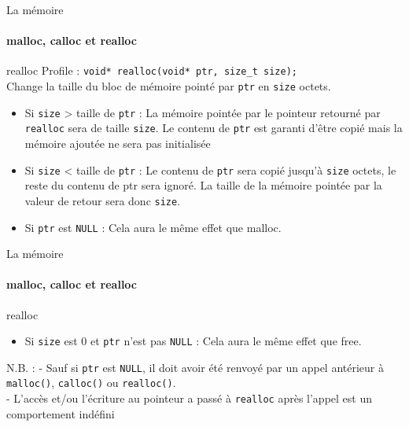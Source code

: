 	\begin{frame}{La mémoire}
		\framesubtitle{malloc, calloc et realloc}
		\begin{block}{realloc}
			\alert{Profile} : \texttt{void* realloc(void* ptr, size\_t size);} \\
			Change la taille du bloc de mémoire pointé par \texttt{ptr} en \texttt{size} octets. 
			\begin{itemize}
				\item Si \texttt{size} > taille de \texttt{ptr} : La mémoire pointée par le pointeur retourné par \texttt{realloc} sera de taille \texttt{size}. Le contenu de \texttt{ptr} est garanti d'être copié mais la mémoire ajoutée ne sera \alert{pas initialisée}
				\item Si \texttt{size} < taille de \texttt{ptr} : Le contenu de \texttt{ptr} sera copié jusqu'à \texttt{size} octets, le reste du contenu de ptr sera ignoré. La taille de la mémoire pointée par la valeur de retour sera donc \texttt{size}.
				\item Si \texttt{ptr} est \texttt{NULL} : Cela aura le même effet que malloc.
			\end{itemize}
		\end{block}
	\end{frame}

	\begin{frame}{La mémoire}
		\framesubtitle{malloc, calloc et realloc}
		\begin{block}{realloc}
			\begin{itemize}
				\item Si \texttt{size} est $0$ et \texttt{ptr} n'est pas \texttt{NULL} :  Cela aura le même effet que free.
			\end{itemize}
		\end{block}
		\begin{alertblock}{N.B. :}
			- Sauf si \texttt{ptr} est \texttt{NULL}, il doit avoir été renvoyé par un appel antérieur
			à \texttt{malloc()}, \texttt{calloc()} ou \texttt{realloc()}. \\
			- L'accès et/ou l'écriture au pointeur a passé à \texttt{realloc} après l'appel est un \alert{comportement indéfini}\\
		\end{alertblock}
	\end{frame}

